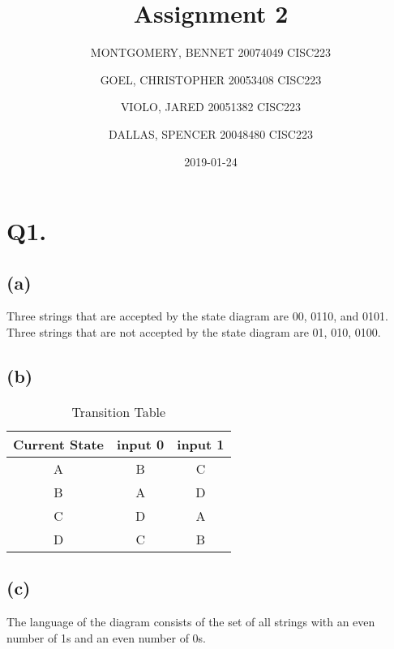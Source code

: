 \documentclass{article}
\title{Assignment 2}
\date{2019-01-24}
\author{MONTGOMERY, BENNET 20074049 CISC223\\
		\and GOEL, CHRISTOPHER 20053408 CISC223\\
		\and VIOLO, JARED 20051382 CISC223\\
		\and DALLAS, SPENCER 20048480 CISC223}
\begin{document}
	\maketitle
	
	\section*{Q1.}
	\subsection*{(a)}
	Three strings that are accepted by the state diagram are 00, 0110, and 0101. Three strings that are not accepted by the state diagram are 01, 010, 0100.
	\subsection*{(b)}
	\begin{table}[ht]
		\caption{Transition Table}
		\centering
		\begin{tabular}{ c | c c }
			\hline
			\hline	
			Current State & input 0 & input 1 \\
			\hline
			A & B & C \\
			B & A & D \\
			C & D & A \\
			D & C & B \\
			\hline
		\end{tabular}
	\end{table}
	\subsection*{(c)}
	The language of the diagram consists of the set of all strings with an even number of 1s and an even number of 0s.
	
\end{document}
